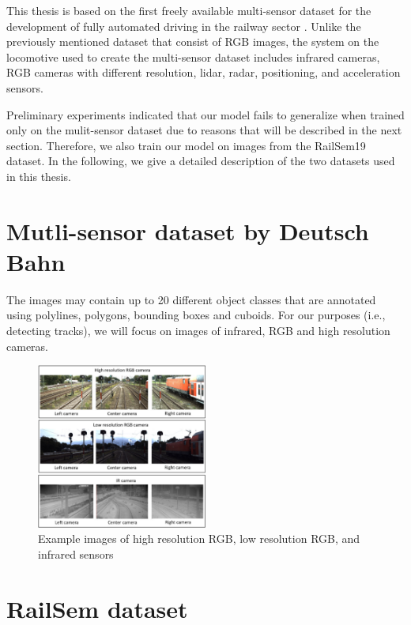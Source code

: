 \documentclass[Master,MDS,english]{BASE/twbook} %
\begin{document}
This thesis is based on the first freely available multi-sensor dataset for the development of fully
automated driving in the railway sector \citep{DB2023, tagiew2023osdar23}.
Unlike the previously mentioned dataset that consist of RGB images, the system on the locomotive used to create the multi-sensor dataset includes infrared cameras, RGB cameras with different resolution, lidar, radar, positioning, and acceleration sensors.

Preliminary experiments indicated that our model fails to generalize when trained only on the mulit-sensor dataset due to reasons that will be described in the next section. Therefore, we also train our model on images from the RailSem19 dataset.
In the following, we give a detailed description of the two datasets used in this thesis.


\section{Mutli-sensor dataset by Deutsch Bahn}

The images may contain up to 20 different object classes that are annotated
using polylines, polygons, bounding boxes and cuboids. For our purposes (i.e., detecting tracks),
we will focus on images of infrared, RGB and high resolution cameras.  

\begin{figure}[h]
\caption{Example images of high resolution RGB, low resolution RGB, and infrared sensors \citep{tagiew2023osdar23} }
\centering
\includegraphics[width=0.5\textwidth]{images/datasets/db/2024-01-29 19_50_46-2305.03001}
\end{figure}



\section{RailSem dataset}
\end{document}
